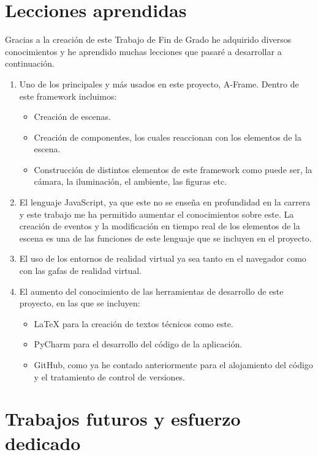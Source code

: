\documentclass[a4paper, 12pt]{book}
\begin{document}
\section{Lecciones aprendidas}
\label{sec:lecciones_aprendidas}

Gracias a la creación de este Trabajo de Fin de Grado he adquirido diversos conocimientos y he aprendido muchas lecciones que pasaré a desarrollar a continuación.
\begin{enumerate}
  \item Uno de los principales y más usados en este proyecto, A-Frame. Dentro de este framework incluimos:
  \begin{itemize}
      \item Creación de escenas.
      \item Creación de componentes, los cuales reaccionan con los elementos de la escena.
      \item Construcción de distintos elementos de este framework como puede ser, la cámara, la iluminación, el ambiente, las figuras etc.
  \end{itemize}
  \item El lenguaje JavaScript, ya que este no se enseña en profundidad en la carrera y este trabajo me ha permitido aumentar el conocimientos sobre este. La creación de eventos y la modificación en tiempo real de los elementos de la escena es una de las funciones de este lenguaje que se incluyen en el proyecto.
  \item El uso de los entornos de realidad virtual ya sea tanto en el navegador como con las gafas de realidad virtual.
  \item El aumento del conocimiento de las herramientas de desarrollo de este proyecto, en las que se incluyen:
  \begin{itemize}
      \item LaTeX para la creación de textos técnicos como este.
      \item PyCharm para el desarrollo del código de la aplicación.
      \item GitHub, como ya he contado anteriormente para el alojamiento del código y el tratamiento de control de versiones.
  \end{itemize}
\end{enumerate}


\section{Trabajos futuros y esfuerzo dedicado}
\label{sec:trabajos_futuros}
\end{document}
